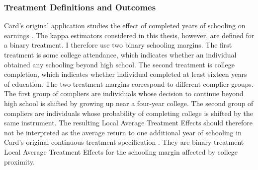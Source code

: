 \documentclass[12pt, a4paper, oneside]{article}
\theoremstyle{plain}
\theoremstyle{definition}
\begin{document}
\subsubsection{Treatment Definitions and Outcomes}
Card's original application studies the effect of completed years of schooling on earnings \citep{card1993using}. The kappa estimators considered in this thesis, however, are defined for a binary treatment. I therefore use two binary schooling margins. The first treatment is some college attendance, which indicates whether an individual  obtained any schooling beyond high school. The second treatment is college completion,
which indicates whether individual completed at least sixteen years of education. 
The two treatment margins correspond to different complier groups. The first group of compliers are individuals whose decision to continue beyond high school is shifted by growing up near a four-year college. The second group of compliers are individuals whose probability of completing college is shifted by the same instrument. The resulting Local Average Treatment Effects should therefore not be interpreted as the average return to one additional year of schooling in Card's original continuous-treatment specification \citep{card1993using}. They are binary-treatment Local Average Treatment Effects for the schooling margin affected by college proximity.\\
\end{document}
